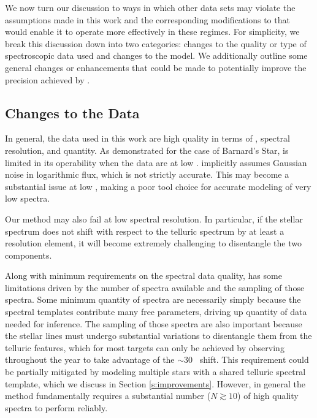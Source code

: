 \documentclass[modern]{aastex62}
\newcommand{\Mdwarf}{Barnard's Star\xspace} %
\begin{document}
We now turn our discussion to ways in which other data sets may violate the assumptions made in this work and the corresponding modifications to \wobble that would enable it to operate more effectively in these regimes. 
For simplicity, we break this discussion down into two categories: changes to the quality or type of spectroscopic data used and changes to the model. 
We additionally outline some general changes or enhancements that could be made to potentially improve the \RV precision achieved by \wobble. 

\subsection{Changes to the Data}
\label{s:data-changes}

In general, the data used in this work are high quality in terms of \SNR, spectral resolution, and quantity. 
As demonstrated for the case of \Mdwarf, \wobble is limited in its operability when the data are at low \SNR. 
\wobble implicitly assumes Gaussian noise in logarithmic flux, which is not strictly accurate. 
This may become a substantial issue at low \SNR, making \wobble a poor tool choice for accurate modeling of very low \SNR spectra. 

Our method may also fail at low spectral resolution. 
In particular, if the stellar spectrum does not shift with respect to the telluric spectrum by at least a resolution element, it will become extremely challenging to disentangle the two components. 

Along with minimum requirements on the spectral data quality, \wobble has some limitations driven by the number of spectra available and the sampling of those spectra. 
Some minimum quantity of spectra are necessarily simply because the spectral templates contribute many free parameters, driving up quantity of data needed for inference. 
The sampling of those spectra are also important because the stellar lines must undergo substantial \RV variations to disentangle them from the telluric features, which for most targets can only be achieved by observing throughout the year to take advantage of the $\sim 30$ \kms~\BERV shift. 
This requirement could be partially mitigated by modeling multiple stars with a shared telluric spectral template, which we discuss in Section \ref{s:improvements}. 
However, in general the \wobble method fundamentally requires a substantial number ($N \gtrsim 10$) of high quality spectra to perform reliably.
\end{document}
